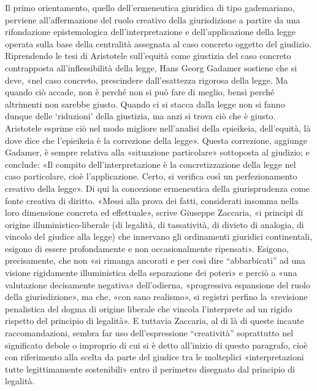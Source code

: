 Il primo orientamento, quello dell’ermeneutica giuridica di tipo gademariano, perviene all’affermazione del ruolo creativo della giurisdizione a partire da una rifondazione epistemologica dell’interpretazione e dell’applicazione della legge operata sulla base della centralità assegnata al caso concreto oggetto del giudizio. Riprendendo le tesi di Aristotele sull’equità come giustizia del caso concreto contrapposta all’inflessibilità della legge, Hans Georg Gadamer sostiene che si deve, «nel caso concreto, prescindere dall’esattezza rigorosa della legge. Ma quando ciò accade, non è perché non si può fare di meglio, bensì perché altrimenti non sarebbe giusto. Quando ci si stacca dalla legge non si fanno dunque delle ‘riduzioni’ della giustizia, ma anzi si trova ciò che è giusto. Aristotele esprime ciò nel modo migliore nell’analisi della epieikeia, dell’equità, là dove dice che l’epieikeia è la correzione della legge». Questa correzione, aggiunge Gadamer, è sempre relativa alla «situazione particolare» sottoposta al giudizio; e conclude: «Il compito dell’interpretazione è la concretizzazione della legge nel caso particolare, cioè l’applicazione. Certo, si verifica così un perfezionamento creativo della legge». Di qui la concezione ermeneutica della giurisprudenza come fonte creativa di diritto. «Messi alla prova dei fatti, considerati insomma nella loro dimensione concreta ed effettuale», scrive Giuseppe Zaccaria, «i principi di origine illuministico-liberale (di legalità, di tassatività, di divieto di analogia, di vincolo del giudice alla legge) che innervano gli ordinamenti giuridici continentali, esigono di essere profondamente e non occasionalmente ripensati». Esigono, precisamente, che non «si rimanga ancorati e per così dire “abbarbicati” ad una visione rigidamente illuministica della separazione dei poteri» e perciò a «una valutazione decisamente negativa» dell’odierna, «progressiva espansione del ruolo della giurisdizione», ma che, «con sano realismo», si registri perfino la «revisione penalistica del dogma di origine liberale che vincola l’interprete ad un rigido rispetto del principio di legalità». E tuttavia Zaccaria, al di là di queste incaute raccomandazioni, sembra far uso dell’espressione “creatività” soprattutto nel significato debole o improprio di cui si è detto all’inizio di questo paragrafo, cioè con riferimento alla scelta da parte del giudice tra le molteplici «interpretazioni tutte legittimamente sostenibili» entro il perimetro disegnato dal principio di legalità.

